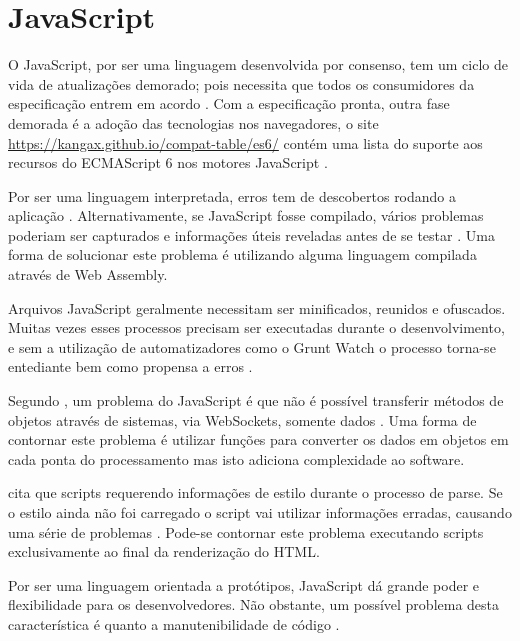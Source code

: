 \section{JavaScript}

O JavaScript, por ser uma linguagem desenvolvida por consenso, tem um
ciclo de vida de atualizações demorado; pois necessita que todos os
consumidores da especificação entrem em acordo . Com a especificação
pronta, outra fase demorada é a adoção das tecnologias nos
navegadores, o site \url{https://kangax.github.io/compat-table/es6/}
contém uma lista do suporte aos recursos do ECMAScript 6 nos motores
JavaScript .

Por ser uma linguagem interpretada, erros tem de descobertos rodando a
aplicação . Alternativamente,
se JavaScript fosse compilado, vários problemas poderiam ser capturados
e informações úteis reveladas antes de se testar \autocite[p.
12]{viabilityBusinessApplications}. Uma forma de solucionar 
este problema é utilizando alguma linguagem compilada através de 
Web Assembly.

Arquivos JavaScript geralmente necessitam ser minificados, reunidos e
ofuscados. Muitas vezes esses processos precisam ser executadas durante
o desenvolvimento, e sem a utilização de automatizadores como o Grunt
Watch o processo torna-se entediante bem como propensa a erros .

Segundo \citet{htmlResearchJournal}, um problema do JavaScript é que
não é possível transferir métodos de objetos através de sistemas,
via WebSockets, somente dados .
Uma forma de contornar este problema é utilizar funções para
converter os dados em objetos em cada ponta do processamento mas isto
adiciona complexidade ao software.

\citet{howBrowsersWork} cita que scripts requerendo informações de
estilo durante o processo de parse. Se o estilo ainda não foi carregado
o script vai utilizar informações erradas, causando uma série de
problemas . Pode-se
contornar este problema executando scripts exclusivamente ao final da
renderização do HTML.

Por ser uma linguagem orientada a protótipos, JavaScript dá grande
poder e flexibilidade para os desenvolvedores. Não obstante, um
possível problema desta característica é quanto a manutenibilidade de
código .

